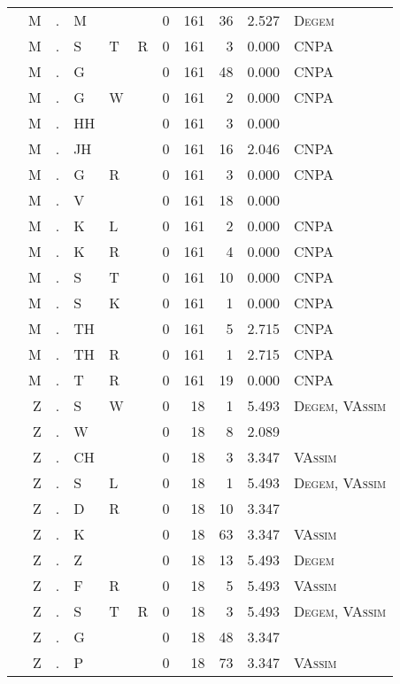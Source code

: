 \begin{longtable}{r@{ } r@{ } c@{ } l@{ } l@{ } l@{ } r r r r l }
 & M & . & M &  &  & 0 & 161 & 36 & 2.527 & \textsc{Degem} \\
 & M & . & S & T & R & 0 & 161 & 3 & 0.000 & \textsc{CNPA} \\
 & M & . & G &  &  & 0 & 161 & 48 & 0.000 & \textsc{CNPA} \\
 & M & . & G & W &  & 0 & 161 & 2 & 0.000 & \textsc{CNPA} \\
 & M & . & HH &  &  & 0 & 161 & 3 & 0.000 &  \\
 & M & . & JH &  &  & 0 & 161 & 16 & 2.046 & \textsc{CNPA} \\
 & M & . & G & R &  & 0 & 161 & 3 & 0.000 & \textsc{CNPA} \\
 & M & . & V &  &  & 0 & 161 & 18 & 0.000 &  \\
 & M & . & K & L &  & 0 & 161 & 2 & 0.000 & \textsc{CNPA} \\
 & M & . & K & R &  & 0 & 161 & 4 & 0.000 & \textsc{CNPA} \\
 & M & . & S & T &  & 0 & 161 & 10 & 0.000 & \textsc{CNPA} \\
 & M & . & S & K &  & 0 & 161 & 1 & 0.000 & \textsc{CNPA} \\
 & M & . & TH &  &  & 0 & 161 & 5 & 2.715 & \textsc{CNPA} \\
 & M & . & TH & R &  & 0 & 161 & 1 & 2.715 & \textsc{CNPA} \\
 & M & . & T & R &  & 0 & 161 & 19 & 0.000 & \textsc{CNPA} \\
 & Z & . & S & W &  & 0 & 18 & 1 & 5.493 & \textsc{Degem}, \textsc{VAssim} \\
 & Z & . & W &  &  & 0 & 18 & 8 & 2.089 &  \\
 & Z & . & CH &  &  & 0 & 18 & 3 & 3.347 & \textsc{VAssim} \\
 & Z & . & S & L &  & 0 & 18 & 1 & 5.493 & \textsc{Degem}, \textsc{VAssim} \\
 & Z & . & D & R &  & 0 & 18 & 10 & 3.347 &  \\
 & Z & . & K &  &  & 0 & 18 & 63 & 3.347 & \textsc{VAssim} \\
 & Z & . & Z &  &  & 0 & 18 & 13 & 5.493 & \textsc{Degem} \\
 & Z & . & F & R &  & 0 & 18 & 5 & 5.493 & \textsc{VAssim} \\
 & Z & . & S & T & R & 0 & 18 & 3 & 5.493 & \textsc{Degem}, \textsc{VAssim} \\
 & Z & . & G &  &  & 0 & 18 & 48 & 3.347 &  \\
 & Z & . & P &  &  & 0 & 18 & 73 & 3.347 & \textsc{VAssim} \\

\end{longtable}
